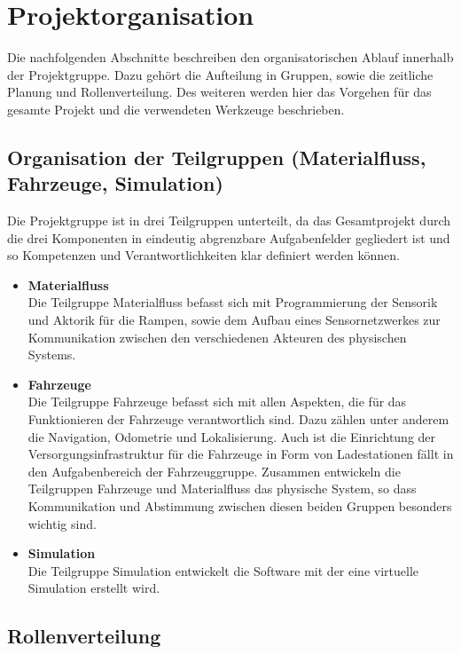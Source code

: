 \section{Projektorganisation}
Die nachfolgenden Abschnitte beschreiben den organisatorischen Ablauf innerhalb der Projektgruppe. Dazu geh\"ort die Aufteilung in Gruppen, sowie die zeitliche Planung und Rollenverteilung. Des weiteren werden hier das Vorgehen f\"ur das gesamte Projekt und die verwendeten Werkzeuge beschrieben.

\subsection{Organisation der Teilgruppen (Materialfluss, Fahrzeuge, Simulation)}
Die Projektgruppe ist in drei Teilgruppen unterteilt, da das Gesamtprojekt durch die drei Komponenten in eindeutig abgrenzbare Aufgabenfelder gegliedert ist und so Kompetenzen und Verantwortlichkeiten klar definiert werden können. 

\begin{itemize}
\item \textbf{Materialfluss} \\
Die Teilgruppe Materialfluss befasst sich mit Programmierung der Sensorik und Aktorik für die Rampen, sowie dem Aufbau eines Sensornetzwerkes zur Kommunikation zwischen den verschiedenen Akteuren des physischen Systems. 

\item \textbf{Fahrzeuge} \\
Die Teilgruppe Fahrzeuge befasst sich mit allen Aspekten, die für das Funktionieren der Fahrzeuge verantwortlich sind. Dazu zählen unter anderem die Navigation, Odometrie und Lokalisierung. Auch ist die Einrichtung der Versorgungsinfrastruktur für die Fahrzeuge in Form von Ladestationen f\"allt in den Aufgabenbereich der Fahrzeuggruppe. Zusammen entwickeln die Teilgruppen Fahrzeuge und Materialfluss das physische System, so dass Kommunikation und Abstimmung zwischen diesen beiden Gruppen besonders wichtig sind. 

\item \textbf{Simulation} \\
Die Teilgruppe Simulation entwickelt die Software mit der eine virtuelle Simulation erstellt wird. 
\end{itemize}

\subsection{Rollenverteilung}

